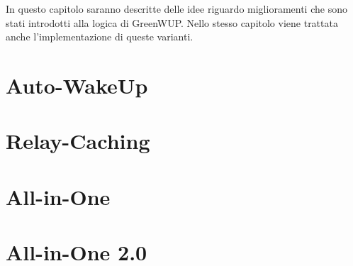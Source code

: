 In questo capitolo saranno descritte delle idee riguardo miglioramenti che sono stati introdotti alla logica di GreenWUP. Nello stesso capitolo viene trattata anche l'implementazione di queste varianti.

\section{Auto-WakeUp}


\section{Relay-Caching}


\section{All-in-One}


\section{All-in-One 2.0}
